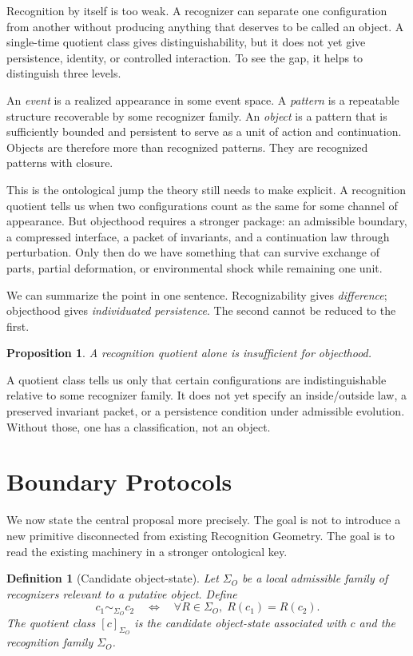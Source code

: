 \documentclass[11pt]{article}
\newtheorem{definition}{Definition}
\newtheorem{proposition}{Proposition}
\begin{document}
Recognition by itself is too weak.
A recognizer can separate one configuration from another without producing anything that deserves to be called an object.
A single-time quotient class gives distinguishability, but it does not yet give persistence, identity, or controlled interaction.
To see the gap, it helps to distinguish three levels.

An \emph{event} is a realized appearance in some event space.
A \emph{pattern} is a repeatable structure recoverable by some recognizer family.
An \emph{object} is a pattern that is sufficiently bounded and persistent to serve as a unit of action and continuation.
Objects are therefore more than recognized patterns.
They are recognized patterns with closure.

This is the ontological jump the theory still needs to make explicit.
A recognition quotient tells us when two configurations count as the same for some channel of appearance.
But objecthood requires a stronger package: an admissible boundary, a compressed interface, a packet of invariants, and a continuation law through perturbation.
Only then do we have something that can survive exchange of parts, partial deformation, or environmental shock while remaining one unit.

We can summarize the point in one sentence.
Recognizability gives \emph{difference}; objecthood gives \emph{individuated persistence}.
The second cannot be reduced to the first.

\begin{proposition}
A recognition quotient alone is insufficient for objecthood.
\end{proposition}

\noindent
A quotient class tells us only that certain configurations are indistinguishable relative to some recognizer family.
It does not yet specify an inside/outside law, a preserved invariant packet, or a persistence condition under admissible evolution.
Without those, one has a classification, not an object.

\section{Boundary Protocols}

We now state the central proposal more precisely.
The goal is not to introduce a new primitive disconnected from existing Recognition Geometry.
The goal is to read the existing machinery in a stronger ontological key.

\begin{definition}[Candidate object-state]
Let $\Sigma_O$ be a local admissible family of recognizers relevant to a putative object.
Define
\[
c_1 \sim_{\Sigma_O} c_2
\quad \Longleftrightarrow \quad
\forall R \in \Sigma_O,\; R(c_1)=R(c_2).
\]
The quotient class $[c]_{\Sigma_O}$ is the candidate object-state associated with $c$ and the recognition family $\Sigma_O$.
\end{definition}
\end{document}
